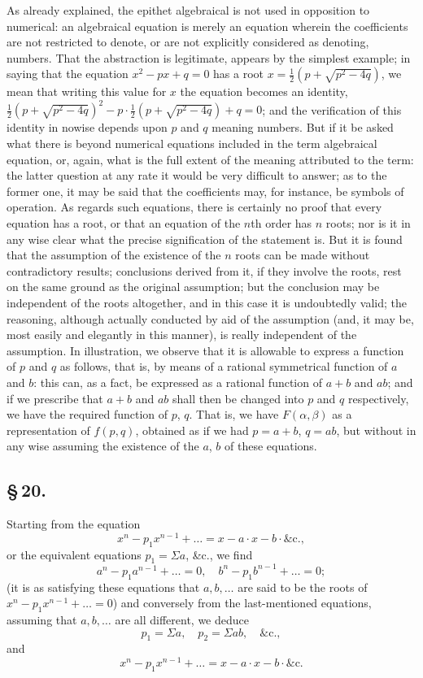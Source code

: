 \documentclass[11pt,a4paper]{article}
\begin{document}
As already explained, the epithet algebraical is not used in opposition to numerical: an algebraical equation is merely an equation wherein the coefficients are not restricted to denote, or are not explicitly considered as denoting, numbers. That the abstraction is legitimate, appears by the simplest example; in saying that the equation $x^{2} - px + q = 0$ has a root $x = \frac{1}{2}(p + \sqrt{p^{2} - 4q})$, we mean that writing this value for $x$ the equation becomes an identity, $\frac{1}{2}(p + \sqrt{p^{2} - 4q})^{2} - p\cdot\frac{1}{2}(p + \sqrt{p^{2} - 4q}) + q = 0$; and the verification of this identity in nowise depends upon $p$ and $q$ meaning numbers. But if it be asked what there is beyond numerical equations included in the term algebraical equation, or, again, what is the full extent of the meaning attributed to the term: the latter question at any rate it would be very difficult to answer; as to the former one, it may be said that the coefficients may, for instance, be symbols of operation. As regards such equations, there is certainly no proof that every equation has a root, or that an equation of the $n$th order has $n$ roots; nor is it in any wise clear what the precise signification of the statement is. But it is found that the assumption of the existence of the $n$ roots can be made without contradictory results; conclusions derived from it, if they involve the roots, rest on the same ground as the original assumption; but the conclusion may be independent of the roots altogether, and in this case it is undoubtedly valid; the reasoning, although actually conducted by aid of the assumption (and, it may be, most easily and elegantly in this manner), is really independent of the assumption. In illustration, we observe that it is allowable to express a function of $p$ and $q$ as follows, that is, by means of a rational symmetrical function of $a$ and $b$: this can, as a fact, be expressed as a rational function of $a + b$ and $ab$; and if we prescribe that $a + b$ and $ab$ shall then be changed into $p$ and $q$ respectively, we have the required function of $p$, $q$. That is, we have $F(\alpha, \beta)$ as a representation of $f(p, q)$, obtained as if we had $p = a + b$, $q = ab$, but without in any wise assuming the existence of the $a$, $b$ of these equations.

\subsection*{\S\,20.}

Starting from the equation
\[
x^{n} - p_{1}x^{n-1} + \ldots = x - a \cdot x - b \cdot \&\text{c.},
\]
or the equivalent equations $p_{1} = \Sigma a$, \&c., we find
\[
a^{n} - p_{1}a^{n-1} + \ldots = 0, \quad b^{n} - p_{1}b^{n-1} + \ldots = 0;
\]
(it is as satisfying these equations that $a, b, \ldots$ are said to be the roots of $x^{n} - p_{1}x^{n-1} + \ldots = 0$) and conversely from the last-mentioned equations, assuming that $a, b, \ldots$ are all different, we deduce
\[
p_{1} = \Sigma a, \quad p_{2} = \Sigma ab, \quad \&\text{c.},
\]
and
\[
x^{n} - p_{1}x^{n-1} + \ldots = x - a \cdot x - b \cdot \&\text{c.}
\]
\end{document}
